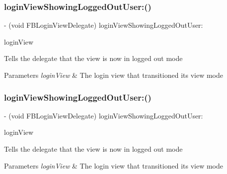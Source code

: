 \subsubsection{\texorpdfstring{login\+View\+Showing\+Logged\+Out\+User\+:()}{loginViewShowingLoggedOutUser:()}\hspace{0.1cm}{\footnotesize\ttfamily [1/5]}}
{\footnotesize\ttfamily -\/ (void F\+B\+Login\+View\+Delegate) login\+View\+Showing\+Logged\+Out\+User\+: \begin{DoxyParamCaption}\item[{(\hyperlink{interfaceFBLoginView}{F\+B\+Login\+View} $\ast$)}]{login\+View }\end{DoxyParamCaption}\hspace{0.3cm}{\ttfamily [optional]}}

Tells the delegate that the view is now in logged out mode


\begin{DoxyParams}{Parameters}
{\em login\+View} & The login view that transitioned its view mode \\
\hline
\end{DoxyParams}
\mbox{\label{protocolFBLoginViewDelegate_01-p_a39d98ab433b5919a9e1e96388bbdc691}} 
\subsubsection{\texorpdfstring{login\+View\+Showing\+Logged\+Out\+User\+:()}{loginViewShowingLoggedOutUser:()}\hspace{0.1cm}{\footnotesize\ttfamily [2/5]}}
{\footnotesize\ttfamily -\/ (void F\+B\+Login\+View\+Delegate) login\+View\+Showing\+Logged\+Out\+User\+: \begin{DoxyParamCaption}\item[{(\hyperlink{interfaceFBLoginView}{F\+B\+Login\+View} $\ast$)}]{login\+View }\end{DoxyParamCaption}\hspace{0.3cm}{\ttfamily [optional]}}

Tells the delegate that the view is now in logged out mode


\begin{DoxyParams}{Parameters}
{\em login\+View} & The login view that transitioned its view mode \\
\hline
\end{DoxyParams}
\mbox{\label{protocolFBLoginViewDelegate_01-p_a39d98ab433b5919a9e1e96388bbdc691}} 
